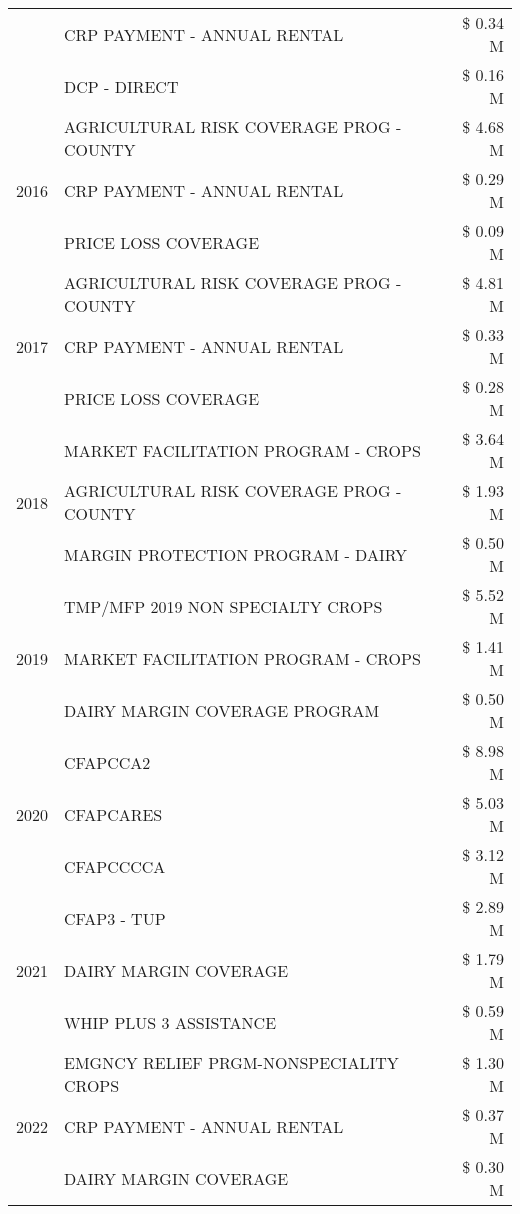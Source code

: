 \begin{tabular}{llr}
 & CRP PAYMENT - ANNUAL RENTAL & \$ 0.34 M \\
 & DCP - DIRECT & \$ 0.16 M \\
\cline{1-3}
\multirow[t]{3}{*}{2016} & AGRICULTURAL RISK COVERAGE PROG - COUNTY & \$ 4.68 M \\
 & CRP PAYMENT - ANNUAL RENTAL & \$ 0.29 M \\
 & PRICE LOSS COVERAGE & \$ 0.09 M \\
\cline{1-3}
\multirow[t]{3}{*}{2017} & AGRICULTURAL RISK COVERAGE PROG - COUNTY & \$ 4.81 M \\
 & CRP PAYMENT - ANNUAL RENTAL & \$ 0.33 M \\
 & PRICE LOSS COVERAGE & \$ 0.28 M \\
\cline{1-3}
\multirow[t]{3}{*}{2018} & MARKET FACILITATION PROGRAM - CROPS & \$ 3.64 M \\
 & AGRICULTURAL RISK COVERAGE PROG - COUNTY & \$ 1.93 M \\
 & MARGIN PROTECTION PROGRAM - DAIRY & \$ 0.50 M \\
\cline{1-3}
\multirow[t]{3}{*}{2019} & TMP/MFP 2019 NON SPECIALTY CROPS & \$ 5.52 M \\
 & MARKET FACILITATION PROGRAM - CROPS & \$ 1.41 M \\
 & DAIRY MARGIN COVERAGE PROGRAM & \$ 0.50 M \\
\cline{1-3}
\multirow[t]{3}{*}{2020} & CFAPCCA2 & \$ 8.98 M \\
 & CFAPCARES & \$ 5.03 M \\
 & CFAPCCCCA & \$ 3.12 M \\
\cline{1-3}
\multirow[t]{3}{*}{2021} & CFAP3 - TUP & \$ 2.89 M \\
 & DAIRY MARGIN COVERAGE & \$ 1.79 M \\
 & WHIP PLUS 3 ASSISTANCE & \$ 0.59 M \\
\cline{1-3}
\multirow[t]{3}{*}{2022} & EMGNCY RELIEF PRGM-NONSPECIALITY CROPS & \$ 1.30 M \\
 & CRP PAYMENT - ANNUAL RENTAL & \$ 0.37 M \\
 & DAIRY MARGIN COVERAGE & \$ 0.30 M \\
\cline{1-3}
\bottomrule
\end{tabular}
